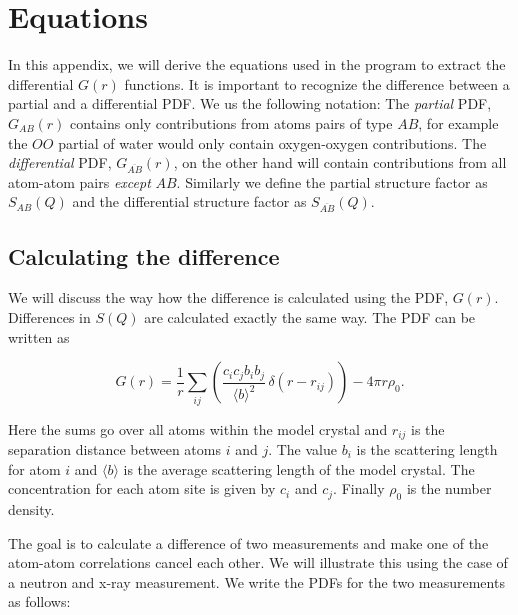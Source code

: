 
\chapter{Equations \label{app}}

In this appendix, we will derive the equations used in the program
to extract the differential $G(r)$ functions. It is important to
recognize the difference between a partial and a differential PDF.
We us the following notation: The \textit{partial} PDF, $G_{AB}(r)$
contains only contributions from atoms pairs of type $AB$, for
example the $OO$ partial of water would only contain oxygen-oxygen
contributions. The \textit{differential} PDF,
$G_{\overline{AB}}(r)$, on the other hand will contain contributions
from all atom-atom pairs \textit{except} $AB$. Similarly we define
the partial structure factor as $S_{AB}(Q)$ and the differential
structure factor as $S_{\overline{AB}}(Q)$.


\section{Calculating the difference \label{app-calc}}

We will discuss the way how the difference is calculated using the
PDF, $G(r)$. Differences in $S(Q)$ are calculated exactly the same
way. The PDF can be written as

\begin{equation}
  G(r) = \frac{1}{r} \sum_{ij} \left (
         \frac{c_{i}c_{j}b_{i}b_{j}}{\langle b \rangle ^{2}}
         \, \delta (r - r_{ij}) \right )   - 4 \pi r \rho_{0}.
 \label{eq:gr}
\end{equation}

\noindent Here the sums go over all atoms within the model crystal
and $r_{ij}$ is the separation distance between atoms $i$ and $j$.
The value $b_{i}$ is the scattering length for atom $i$ and $\langle
b \rangle$ is the average scattering length of the model crystal.
The concentration for each atom site is given by $c_{i}$ and
$c_{j}$. Finally $\rho_{0}$ is the number density.

The goal is to calculate a difference of two measurements and make
one of the atom-atom correlations cancel each other. We will
illustrate this using the case of a neutron and x-ray measurement.
We write the PDFs for the two measurements as follows:

